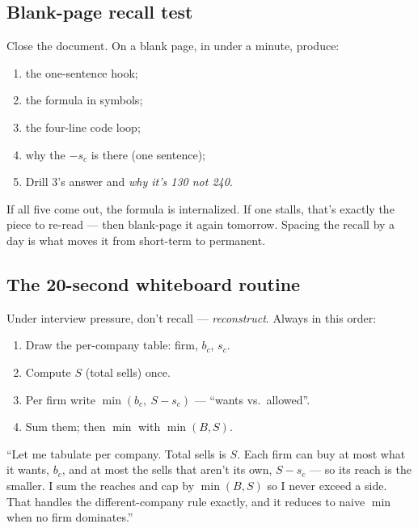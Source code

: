 \subsection{Blank-page recall test}

Close the document. On a blank page, in under a minute, produce:
\begin{enumerate}[leftmargin=1.6em,nosep]
  \item the one-sentence hook;
  \item the formula in symbols;
  \item the four-line code loop;
  \item why the $-s_c$ is there (one sentence);
  \item Drill 3's answer and \emph{why it's 130 not 240}.
\end{enumerate}
If all five come out, the formula is internalized. If one stalls, that's exactly
the piece to re-read --- then blank-page it again tomorrow. Spacing the recall by a
day is what moves it from short-term to permanent.

\subsection{The 20-second whiteboard routine}

Under interview pressure, don't recall --- \emph{reconstruct}. Always in this order:

\begin{enumerate}[leftmargin=1.6em,nosep]
  \item Draw the per-company table: firm, $b_c$, $s_c$.
  \item Compute $S$ (total sells) once.
  \item Per firm write $\min(b_c,\ S-s_c)$ --- ``wants vs.\ allowed''.
  \item Sum them; then $\min$ with $\min(B,S)$.
\end{enumerate}

\begin{say}
``Let me tabulate per company. Total sells is $S$. Each firm can buy at most what
it wants, $b_c$, and at most the sells that aren't its own, $S-s_c$ --- so its
reach is the smaller. I sum the reaches and cap by $\min(B,S)$ so I never exceed a
side. That handles the different-company rule exactly, and it reduces to naive
$\min$ when no firm dominates.''
\end{say}
